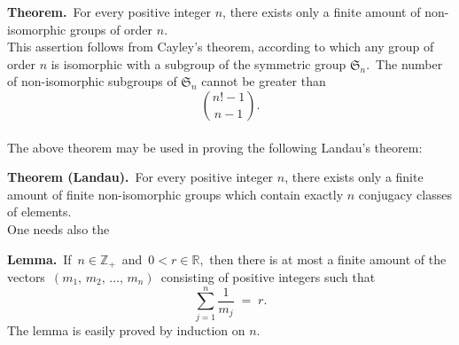 \documentclass[12pt]{article}
\theoremstyle{definition}
\begin{document}
\textbf{Theorem.}\, For every positive integer $n$, there exists only a finite amount of non-isomorphic groups of order $n$.\\

This assertion follows from Cayley's theorem, according to which any group of order $n$ is isomorphic with a subgroup of the symmetric group $\mathfrak{S}_n$.\, The number of non-isomorphic subgroups of $\mathfrak{S}_n$ cannot be greater than
$${n!\!-\!1 \choose n\!-\!1}.$$\\

The above theorem may be used in proving the following Landau's theorem:

\textbf{Theorem (Landau).}\, For every positive integer $n$, there exists only a finite amount of finite non-isomorphic groups which contain exactly $n$ conjugacy classes of elements.\\

One needs also the

\textbf{Lemma.}\, If\, $n \in \mathbb{Z}_+$\, and\, $0 < r \in \mathbb{R}$,\, then there is at most a finite amount of the vectors \,$(m_1,\,m_2,\,\ldots,\,m_n)$\, consisting of positive integers such that
$$\sum_{j=1}^n\frac{1}{m_j} \;=\; r.$$
The lemma is easily proved by induction on $n$.





\end{document}
